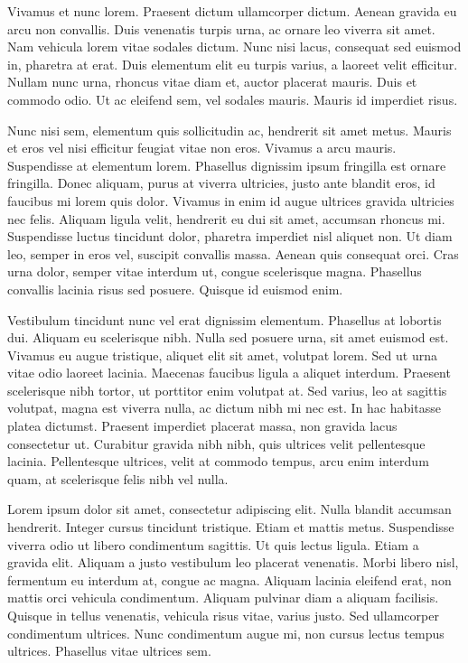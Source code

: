 \documentclass[a4paper,10pt,twoside]{article} %
\begin{document}
Vivamus et nunc lorem.
Praesent dictum ullamcorper dictum.
Aenean gravida eu arcu non convallis.
Duis venenatis turpis urna, ac ornare leo viverra sit amet.
Nam vehicula lorem vitae sodales dictum.
Nunc nisi lacus, consequat sed euismod in, pharetra at erat.
Duis elementum elit eu turpis varius, a laoreet velit efficitur.
Nullam nunc urna, rhoncus vitae diam et, auctor placerat mauris.
Duis et commodo odio.
Ut ac eleifend sem, vel sodales mauris.
Mauris id imperdiet risus.

Nunc nisi sem, elementum quis sollicitudin ac, hendrerit sit amet metus.
Mauris et eros vel nisi efficitur feugiat vitae non eros.
Vivamus a arcu mauris.
Suspendisse at elementum lorem.
Phasellus dignissim ipsum fringilla est ornare fringilla.
Donec aliquam, purus at viverra ultricies, justo ante blandit eros, id faucibus mi lorem quis dolor.
Vivamus in enim id augue ultrices gravida ultricies nec felis.
Aliquam ligula velit, hendrerit eu dui sit amet, accumsan rhoncus mi.
Suspendisse luctus tincidunt dolor, pharetra imperdiet nisl aliquet non.
Ut diam leo, semper in eros vel, suscipit convallis massa.
Aenean quis consequat orci.
Cras urna dolor, semper vitae interdum ut, congue scelerisque magna.
Phasellus convallis lacinia risus sed posuere.
Quisque id euismod enim.

Vestibulum tincidunt nunc vel erat dignissim elementum.
Phasellus at lobortis dui.
Aliquam eu scelerisque nibh.
Nulla sed posuere urna, sit amet euismod est.
Vivamus eu augue tristique, aliquet elit sit amet, volutpat lorem.
Sed ut urna vitae odio laoreet lacinia.
Maecenas faucibus ligula a aliquet interdum.
Praesent scelerisque nibh tortor, ut porttitor enim volutpat at.
Sed varius, leo at sagittis volutpat, magna est viverra nulla, ac dictum nibh mi nec est.
In hac habitasse platea dictumst.
Praesent imperdiet placerat massa, non gravida lacus consectetur ut.
Curabitur gravida nibh nibh, quis ultrices velit pellentesque lacinia.
Pellentesque ultrices, velit at commodo tempus, arcu enim interdum quam, at scelerisque felis nibh vel nulla.

Lorem ipsum dolor sit amet, consectetur adipiscing elit.
Nulla blandit accumsan hendrerit.
Integer cursus tincidunt tristique.
Etiam et mattis metus.
Suspendisse viverra odio ut libero condimentum sagittis.
Ut quis lectus ligula.
Etiam a gravida elit.
Aliquam a justo vestibulum leo placerat venenatis.
Morbi libero nisl, fermentum eu interdum at, congue ac magna.
Aliquam lacinia eleifend erat, non mattis orci vehicula condimentum.
Aliquam pulvinar diam a aliquam facilisis.
Quisque in tellus venenatis, vehicula risus vitae, varius justo.
Sed ullamcorper condimentum ultrices.
Nunc condimentum augue mi, non cursus lectus tempus ultrices.
Phasellus vitae ultrices sem.
\end{document}
